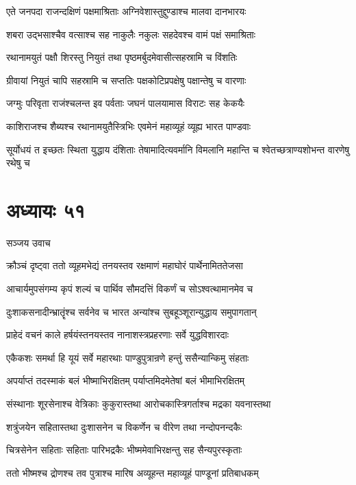 \twolineshloka
{एते जनपदा राजन्दक्षिणं पक्षमाश्रिताः}
{अग्निवेशास्तुद्दुण्डाश्च मालवा दानभारयः}


\twolineshloka
{शबरा उद्भसाश्चैव वत्साश्च सह नाकुलैः}
{नकुलः सहदेवश्च वामं पक्षं समाश्रिताः}


\twolineshloka
{रथानामयुतं पक्षौ शिरस्तु नियुतं तथा}
{पृष्ठमर्बुदमेवासीत्सहस्रामि च विंशतिः}


\twolineshloka
{ग्रीवायां नियुतं चापि सहस्रामि च सप्ततिः}
{पक्षकोटिप्रपक्षेषु पक्षान्तेषु च वारणाः}


\twolineshloka
{जग्मुः परिवृता राजंश्चलन्त इव पर्वताः}
{जघनं पालयामास विराटः सह केकयैः}


\twolineshloka
{काशिराजश्च शैब्यश्च रथानामयुतैस्त्रिभिः}
{एवमेनं महाव्यूहं व्यूह्य भारत पाण्डवाः}


\threelineshloka
{सूर्योधयं त इच्छतः स्थिता युद्धाय दंशिताः}
{तेषामादित्यवर्मानि विमलानि महान्ति च}
{श्वेतच्छत्राण्यशोभन्त वारणेषु रथेषु च}


\chapter{अध्यायः ५१}
\twolineshloka
{सञ्जय उवाच}
{}


\twolineshloka
{क्रौञ्चं दृष्ट्वा ततो व्यूहमभेद्यं तनयस्तव}
{रक्षमाणं महाघोरं पार्थेनामिततेजसा}


\twolineshloka
{आचार्यमुपसंगम्य कृपं शल्यं च पार्थिव}
{सौमदत्तिं विकर्णं च सोऽश्वत्थामानमेव च}


\twolineshloka
{दुःशाकसनादीन्भ्रातॄंश्च सर्वनेव च भारत}
{अन्यांश्च सुबहूञ्शूरान्युद्धाय समुपागतान्}


\twolineshloka
{प्राहेदं वचनं काले हर्षयंस्तनयस्तव}
{नानाशस्त्रप्रहरणाः सर्वे युद्धविशारदाः}


\twolineshloka
{एकैकशः समर्था हि यूयं सर्वे महारथाः}
{पाण्डुपुत्रान्रणे हन्तुं ससैन्यान्किमु संहताः}


\twolineshloka
{अपर्याप्तं तदस्माकं बलं भीष्माभिरक्षितम्}
{पर्याप्तमिदमेतेषां बलं भीमाभिरक्षितम्}


\twolineshloka
{संस्थानाः शूरसेनाश्च वेत्रिकाः कुकुरास्तथा}
{आरोचकास्त्रिगर्ताश्च मद्रका यवनास्तथा}


\twolineshloka
{शत्रुंजयेन सहितास्तथा दुःशासनेन च}
{विकर्णेन च वीरेण तथा नन्दोपनन्दकैः}


\twolineshloka
{चित्रसेनेन सहिताः सहिताः पारिभद्रकैः}
{भीष्ममेवाभिरक्षन्तु सह सैन्यपुरस्कृताः}


\twolineshloka
{ततो भीष्मश्च द्रोणश्च तव पुत्राश्च मारिष}
{अव्यूहन्त महाव्यूहं पाण्डूनां प्रतिबाधकम्}


